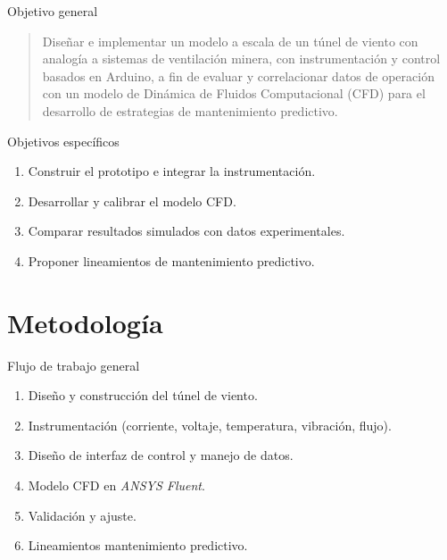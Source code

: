 \begin{frame}{Objetivo general}
    \centering
    \begin{block}{}
    \begin{quote}    
    Diseñar e implementar un \textcolor{UsachVerde}{modelo a escala de un túnel de viento} con analogía a sistemas de ventilación minera, con \textcolor{UsachVerde}{instrumentación y control basados en Arduino}, a fin de evaluar y correlacionar datos de operación con un modelo de \textcolor{UsachVerde}{Dinámica de Fluidos Computacional (CFD)} para el desarrollo de estrategias de \textcolor{UsachVerde}{mantenimiento predictivo}.
    \end{quote}
    \end{block}
\end{frame}

\begin{frame}{Objetivos específicos}
    \begin{enumerate}
      \item Construir el prototipo e integrar la instrumentación.\\[-0.2cm]
      \item Desarrollar y calibrar el modelo CFD.\\[-0.2cm]
      \item Comparar resultados simulados con datos experimentales.\\[-0.2cm]
      \item Proponer lineamientos de mantenimiento predictivo.
    \end{enumerate}
\end{frame}

\section{Metodología}
\begin{frame}{Flujo de trabajo general}
    \centering
    \begin{enumerate}
        \item Diseño y construcción del túnel de viento.
        \item Instrumentación (corriente, voltaje, temperatura, vibración, flujo).
        \item Diseño de interfaz de control y manejo de datos.
        \item Modelo CFD en \textit{ANSYS Fluent}.
        \item Validación y ajuste.
        \item Lineamientos mantenimiento predictivo.
    \end{enumerate}
\end{frame}

